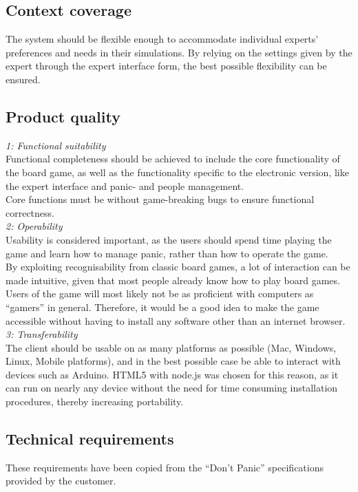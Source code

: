 \subsection{Context coverage}
The system should be flexible enough to accommodate individual experts’ preferences and needs in their simulations. By relying on the settings given by the expert through the expert interface form, the best possible flexibility can be ensured.

\subsection{Product quality}

\emph{1: Functional suitability}\\
Functional completeness should be achieved to include the core functionality 
of the board game, as well as the functionality specific to the electronic 
version, like the expert interface and panic- and people management. 
\\
Core functions must be without game-breaking bugs to ensure functional 
correctness.
\\\newline
\emph{2: Operability}\\
Usability is considered important, as the users should spend time playing the 
game and learn how to manage panic, rather than how to operate the game. 
\\
By exploiting recognisability from classic board games, a lot of interaction 
can be made intuitive, given that most people already know how to play board 
games. 
\\
Users of the game will most likely not be as proficient with computers as 
“gamers” in general. Therefore, it would be a good idea to make the game 
accessible without having to install any software other than an internet browser.
\\\newline
\emph{3: Transferability}\\
The client should be usable on as many platforms as possible (Mac, Windows, 
Linux, Mobile platforms), and in the best possible case be able to interact 
with devices such as Arduino. HTML5 with node.js was chosen for this reason, as 
it can run on nearly any device without the need for time consuming 
installation procedures, thereby increasing portability.


\subsection{Technical requirements}
These requirements have been copied from the “Don’t Panic” specifications 
provided by the customer.\\

